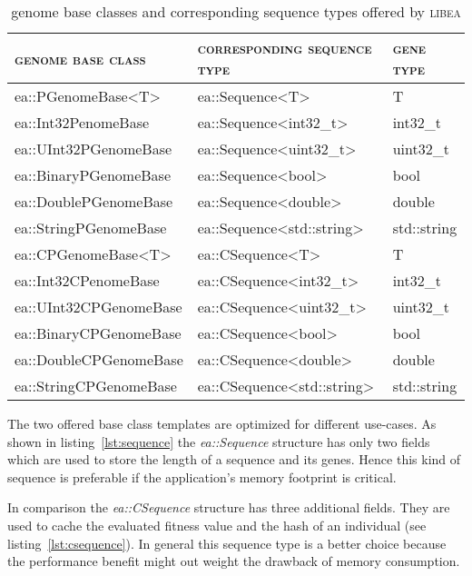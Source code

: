 \documentclass[a4paper]{article}
\begin{document}
\begin{table}
\caption{genome base classes and corresponding sequence types offered by \textsc{libea}}
\label{tab:genome-base-classes-and-sequences}
\begin{tabular}{|l|l|l|}
\hline
\textsc{genome base class} & \textsc{corresponding sequence type} & \textsc{gene type} \\
\hline
ea::PGenomeBase\textless T\textgreater & ea::Sequence\textless T\textgreater & T \\
ea::Int32PenomeBase & ea::Sequence\textless int32\_t\textgreater & int32\_t \\
ea::UInt32PGenomeBase & ea::Sequence\textless uint32\_t\textgreater & uint32\_t \\
ea::BinaryPGenomeBase & ea::Sequence\textless bool\textgreater & bool \\
ea::DoublePGenomeBase & ea::Sequence\textless double\textgreater & double \\
ea::StringPGenomeBase & ea::Sequence\textless std::string\textgreater & std::string \\
\hline
ea::CPGenomeBase\textless T\textgreater & ea::CSequence\textless T\textgreater & T \\
ea::Int32CPenomeBase & ea::CSequence\textless int32\_t\textgreater & int32\_t \\
ea::UInt32CPGenomeBase & ea::CSequence\textless uint32\_t\textgreater & uint32\_t \\
ea::BinaryCPGenomeBase & ea::CSequence\textless bool\textgreater & bool \\
ea::DoubleCPGenomeBase & ea::CSequence\textless double\textgreater & double \\
ea::StringCPGenomeBase & ea::CSequence\textless std::string\textgreater & std::string \\
\hline
\end{tabular}
\end{table}

The two offered base class templates are optimized for different use-cases. As shown in listing~\ref{lst:sequence} the \textit{ea::Sequence} structure has only two fields which are used to store the length of a sequence and its genes. Hence this kind of sequence is preferable if the application's memory footprint is critical.

In comparison the \textit{ea::CSequence} structure has three additional fields. They are used to cache the evaluated fitness value and the hash of an individual (see listing~\ref{lst:csequence}). In general this sequence type is a better choice because the performance benefit might out weight the drawback of memory consumption.
\end{document}
